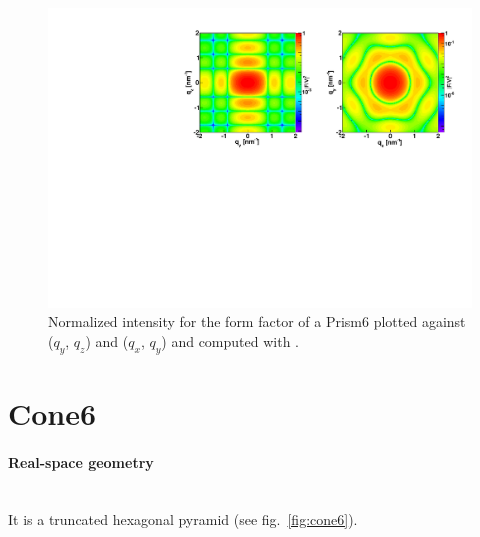 \begin{figure}[h]
\begin{center}
\includegraphics[width=\textwidth]{Figures/figffprism6}
\end{center}
\caption{Normalized intensity for the form factor of a Prism6 plotted against ($q_y$, $q_z$) and ($q_x$, $q_y$) and computed with .}
\label{fig:FFprism6Ex}
\end{figure}


\newpage%
\section{Cone6}  

\paragraph{Real-space geometry}\mbox{}\\
It is a truncated hexagonal pyramid (see fig.~\ref{fig:cone6}). 

